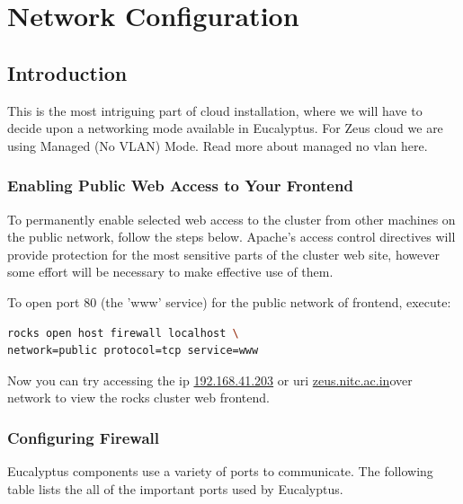 \chapter{Network Configuration}

\section{Introduction}
This is the most intriguing part of cloud installation, where we will have to decide upon a networking mode available in Eucalyptus. For Zeus cloud we are using Managed (No VLAN) Mode. Read more about managed no vlan here\cite{managednovlan}.

\subsection{Enabling Public Web Access to Your Frontend}

To permanently enable selected web access to the cluster from other machines on the public network, follow the steps below. Apache's access control directives will provide protection for the most sensitive parts of the cluster web site, however some effort will be necessary to make effective use of them.

To open port 80 (the 'www' service) for the public network of frontend,  execute:

\begin{lstlisting}[language=bash]
rocks open host firewall localhost \
network=public protocol=tcp service=www
\end{lstlisting}
Now you can try accessing the ip \url{192.168.41.203} or uri \url{zeus.nitc.ac.in}over network to view the rocks cluster web frontend.

\subsection{Configuring Firewall}

Eucalyptus components use a variety of ports to communicate. The following table lists the all of the important ports used by Eucalyptus.

